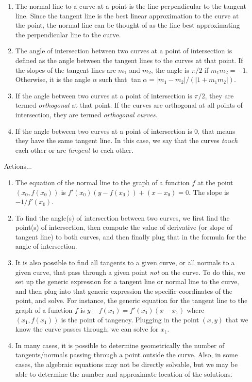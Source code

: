 \documentclass[10pt]{amsart}
\begin{document}
\begin{enumerate}
\item The normal line to a curve at a point is the line perpendicular
  to the tangent line. Since the tangent line is the best linear
  approximation to the curve at the point, the normal line can be
  thought of as the line best approximating the perpendicular line to
  the curve.
\item The angle of intersection between two curves at a point of
  intersection is defined as the angle between the tangent lines to
  the curves at that point. If the slopes of the tangent lines are
  $m_1$ and $m_2$, the angle is $\pi/2$ if $m_1m_2 = -1$. Otherwise,
  it is the angle $\alpha$ such that $\tan \alpha = |m_1 - m_2|/(|1 +
  m_1m_2|)$.
\item If the angle between two curves at a point of intersection is
  $\pi/2$, they are termed {\em orthogonal} at that point. If the
  curves are orthogonal at all points of intersection, they are termed
  {\em orthogonal curves}.
\item If the angle between two curves at a point of intersection is
  $0$, that means they have the same tangent line. In this case, we
  say that the curves {\em touch} each other or are {\em tangent} to
  each other.
\end{enumerate}

Actions...

\begin{enumerate}

\item The equation of the normal line to the graph of a
  function $f$ at the point $(x_0,f(x_0))$ is $f'(x_0)(y - f(x_0))
  + (x - x_0) = 0$. The slope is $-1/f'(x_0)$.
\item To find the angle(s) of intersection between two curves, we
  first find the point(s) of intersection, then compute the value of
  derivative (or slope of tangent line) to both curves, and then
  finally plug that in the formula for the angle of intersection.
\item It is also possible to find all tangents to a given curve, or
  all normals to a given curve, that pass through a given point {\em
  not} on the curve. To do this, we set up the generic expression for
  a tangent line or normal line to the curve, and then plug into that
  generic expression the specific coordinates of the point, and
  solve. For instance, the generic equation for the tangent line to
  the graph of a function $f$ is $y - f(x_1) = f'(x_1)(x - x_1)$ where
  $(x_1,f(x_1))$ is the point of tangency. Plugging in the point
  $(x,y)$ that we know the curve passes through, we can solve for
  $x_1$.
\item In many cases, it is possible to determine geometrically the
  number of tangents/normals passing through a point outside the
  curve. Also, in some cases, the algebraic equations may not be
  directly solvable, but we may be able to determine the number and
  approximate location of the solutions.

\end{enumerate}
\end{document}
